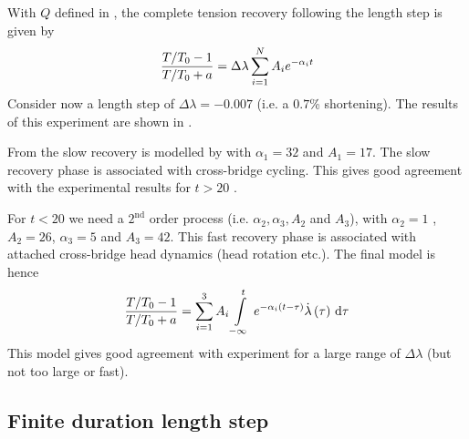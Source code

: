 With $Q$ defined in , the complete tension recovery
following the length step is given by
\begin{equation}
  \dfrac{T/T_{0}-1}{T/T_{0}+a} =\Delta\lambda \displaystyle\sum _{i=1}^{N} A_{i}
  e^{-\alpha_{i}t}
  \label{eqn:tensionrecovery}
\end{equation}
Consider now a length step of $\Delta\lambda=-0.007$ (i.e. a $0.7$\%
shortening). The results of this experiment are shown in
.


From  the slow recovery is modelled by
 with $\alpha_{1}=32$ \mps and $A_{1}=17$.
The slow recovery phase is associated with cross-bridge cycling. This gives
good agreement with the experimental results for $t>20$ \ms.

For $t<20$ \ms we need a $2^{\text{nd}}$ order process (i.e.
$\alpha_{2},\alpha_{3},A_{2}$ and $A_{3}$), with $\alpha_{2}=1$ \mps,
$A_{2}=26$, $\alpha_{3}=5$ \mps and $A_{3}=42$. This fast recovery phase is
associated with attached cross-bridge head dynamics (head rotation etc.).  The
final model is hence
\begin{equation}
  \dfrac{T/T_{0}-1}{T/T_{0}+a}=\dsum_{i=1}^{3} A_{i}\gint{-\infty}{t}
  {e^{-\alpha_{i}\pbrac{t-\tau}}\fnof{\dot{\lambda}}{\tau}}{\tau}
  \label{eqn:fadingmemory}
\end{equation}
This model gives good agreement with experiment for a large range of
$\Delta\lambda$ (but not too large or fast).

\subsection{Finite duration length step}


